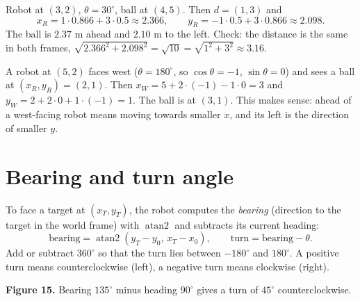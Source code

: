 \begin{example}
Robot at $(3,2)$, $\theta=30^\circ$, ball at $(4,5)$. Then $d=(1,3)$ and
\[
x_R=1\cdot0.866+3\cdot0.5\approx2.366,\qquad y_R=-1\cdot0.5+3\cdot0.866\approx2.098.
\]
The ball is $2.37$ m ahead and $2.10$ m to the left. Check: the distance is the same in both frames, $\sqrt{2.366^2+2.098^2}=\sqrt{10}=\sqrt{1^2+3^2}\approx3.16$.
\end{example}

\begin{example}
A robot at $(5,2)$ faces west ($\theta=180^\circ$, so $\cos\theta=-1$, $\sin\theta=0$) and sees a ball at $(x_R,y_R)=(2,1)$. Then $x_W=5+2\cdot(-1)-1\cdot0=3$ and $y_W=2+2\cdot0+1\cdot(-1)=1$. The ball is at $(3,1)$. This makes sense: ahead of a west-facing robot means moving towards smaller $x$, and its left is the direction of smaller $y$.
\end{example}

\section*{Bearing and turn angle}
To face a target at $(x_T,y_T)$, the robot computes the \emph{bearing} (direction to the target in the world frame) with $\operatorname{atan2}$ and subtracts its current heading:
\[
\text{bearing}=\operatorname{atan2}(y_T-y_0,\,x_T-x_0),\qquad
\text{turn}=\text{bearing}-\theta.
\]
Add or subtract $360^\circ$ so that the turn lies between $-180^\circ$ and $180^\circ$. A positive turn means counterclockwise (left), a negative turn means clockwise (right).

\begin{center}

\small\textbf{Figure 15.} Bearing $135^\circ$ minus heading $90^\circ$ gives a turn of $45^\circ$ counterclockwise.
\end{center}

